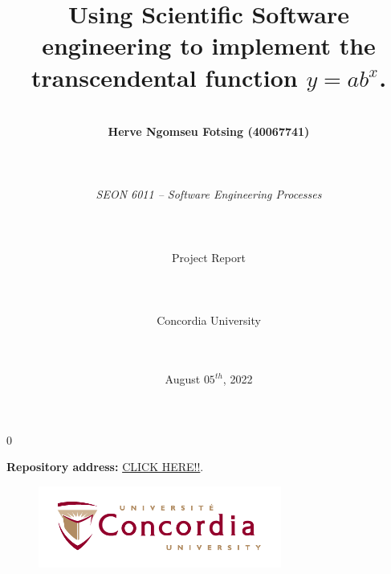 \documentclass[11pt]{article}
\newcommand{\blind}{0}
\begin{document}
		
		\def\spacingset#1{\renewcommand{\baselinestretch}%
			{#1}\small\normalsize} \spacingset{1}
		
		\blind
		{
			\title{Using Scientific Software engineering to implement the transcendental function $y=ab^{x}$.}
			\author{
				\\             
				\textbf {Herve Ngomseu Fotsing (40067741)}\\
				\\
				\\\\
				\emph{SEON 6011 -- Software Engineering Processes}\\
					\\\\\\
					Project Report\\\\\\\\Concordia University\\\\\\
				}
				

			\date{August $05^{th}$, 2022}
			\maketitle
			\begin{center}
				\textbf{Repository address:} \href{https://github.com/ngherve/Transcendental-function-scientific-software-engineering-project-SEON-6011-}{CLICK HERE!!}.

			\end{center}

			\begin{figure}[H]
				\begin{center}
					\includegraphics[width=8cm]{Figures/univ_logo}
				\end{center}
			\end{figure}
		} \fi
		
		
		\bigskip
		
	
			
\end{document}
